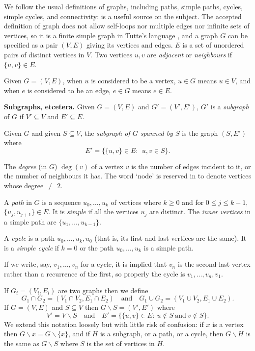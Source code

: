 We follow the usual definitions of graphs, including paths, simple paths,
cycles, simple cycles, and connectivity:
\cite{kant} is a useful source on the subject.
The accepted definition of graph does not allow self-loops nor multiple edges
nor infinite sets of vertices,
so it is a finite simple graph in Tutte's language \cite{tutte},
and a graph $G$ can be specified as a pair $(V,E)$ giving
its vertices and edges. $E$ is a set of
unordered pairs of distinct vertices in $V$.  Two vertices
$u,v$ are {\em adjacent} or {\em neighbours} if
$\{u,v\} \in E$.

Given $G = (V,E)$,
when $u$ is considered to be a  vertex, $u\in G$ means $u\in V$,
and when $e$ is considered to be an edge, $e\in G$ means $e\in E$.

\numpara
\label{subgraphs etcetera} {\bf Subgraphs, etcetera.}
Given $G=(V,E)$ and $G' = (V',E')$, $G'$ is a {\em subgraph}
of $G$ if $V'\subseteq V$ and $E'\subseteq E.$

Given $G$ and given $S \subseteq V$, the {\em subgraph of $G$
spanned by $S$} is the graph $(S,E')$ where
$$ E' = \{ \{u,v\}\in E:~~ u,v \in S\}.$$

The {\em degree} (in $G$) $\deg(v)$ of a vertex $v$ is the number of edges
incident to it, or the number of neighbours it has.
The word `node' is reserved in \cite{tutte} to denote
vertices whose degree $\not=$ $2$.

A {\em path} in $G$ is a sequence $u_0, \ldots, u_k$ of vertices
where $k\geq 0$ and for $0 \leq j \leq k-1$, $\{u_j, u_{j+1} \} \in E$.
It is {\em simple} if all the vertices $u_j$ are distinct.
The {\em inner vertices} in a simple path are
$\{u_1,\ldots,u_{k-1}\}$.

A {\em cycle} is a path $u_0,\ldots, u_k,u_0$ (that is, its
first and last vertices are the same).
It is a {\em simple cycle} if $k=0$ or the path $u_0,\ldots,u_k$
is a simple path.

If we write, say, $v_1,\ldots, v_n$ for a cycle, it is implied
that $v_n$ is the second-last vertex rather than a recurrence
of the first, so properly the cycle is $v_1,\ldots, v_n,v_1$.

If $G_i = (V_i,E_i)$ are
two graphs then we define 
$$G_1 \cap G_2 = (V_1\cap V_2, E_1\cap E_2)\quad\text{and}\quad
G_1 \cup G_2 = (V_1\cup V_2, E_1\cup E_2).$$If $G = (V,E)$ and $S \subseteq V$ then
$ G\backslash S = (V',E')$ where
$$ V' = V \backslash S\quad\text{and}\quad
E' = \{ \{u,v\} \in E:~ u\notin S ~\text{and}~ v\notin S\}.$$ We extend
this notation loosely but with little risk
of confusion: if $x$ is a vertex then $G\backslash x = 
G\backslash \{x\}$, and if $H$ is a subgraph, or a path, or a cycle,
then $G\backslash H$ is the same as $G\backslash S$ where $S$ is the set
of vertices in $H$.


